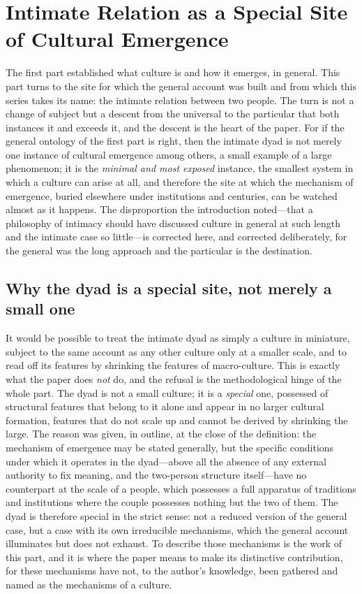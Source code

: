 \section{Intimate Relation as a Special Site of Cultural Emergence}
\label{p24:sec:special}

\noindent
The first part established what culture is and how it emerges, in general. This part turns to the site for which the general account was built and from which this series takes its name: the intimate relation between two people. The turn is not a change of subject but a descent from the universal to the particular that both instances it and exceeds it, and the descent is the heart of the paper. For if the general ontology of the first part is right, then the intimate dyad is not merely one instance of cultural emergence among others, a small example of a large phenomenon; it is the \emph{minimal and most exposed} instance, the smallest system in which a culture can arise at all, and therefore the site at which the mechanism of emergence, buried elsewhere under institutions and centuries, can be watched almost as it happens. The disproportion the introduction noted---that a philosophy of intimacy should have discussed culture in general at such length and the intimate case so little---is corrected here, and corrected deliberately, for the general was the long approach and the particular is the destination.

\subsection*{Why the dyad is a special site, not merely a small one}

It would be possible to treat the intimate dyad as simply a culture in miniature, subject to the same account as any other culture only at a smaller scale, and to read off its features by shrinking the features of macro-culture. This is exactly what the paper does \emph{not} do, and the refusal is the methodological hinge of the whole part. The dyad is not a small culture; it is a \emph{special} one, possessed of structural features that belong to it alone and appear in no larger cultural formation, features that do not scale up and cannot be derived by shrinking the large. The reason was given, in outline, at the close of the definition: the mechanism of emergence may be stated generally, but the specific conditions under which it operates in the dyad---above all the absence of any external authority to fix meaning, and the two-person structure itself---have no counterpart at the scale of a people, which possesses a full apparatus of traditions and institutions where the couple possesses nothing but the two of them. The dyad is therefore special in the strict sense: not a reduced version of the general case, but a case with its own irreducible mechanisms, which the general account illuminates but does not exhaust. To describe those mechanisms is the work of this part, and it is where the paper means to make its distinctive contribution, for these mechanisms have not, to the author's knowledge, been gathered and named as the mechanisms of a culture.

